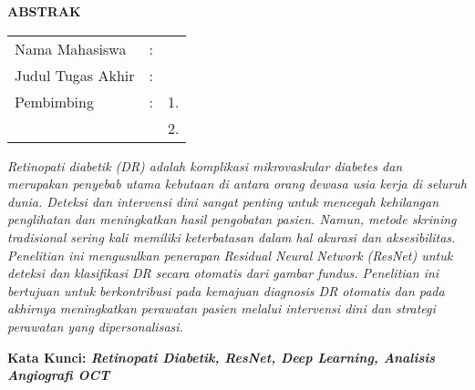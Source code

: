 \begin{center}
  \large\textbf{ABSTRAK}
\end{center}


\vspace{2ex}

\begingroup
\setlength{\tabcolsep}{0pt}

\noindent
\begin{tabularx}{\textwidth}{l >{\centering}m{2em} X}
  Nama Mahasiswa    & : & \name{}         \\

  Judul Tugas Akhir & : & \tatitle{}      \\

  Pembimbing        & : & 1. \advisor{}   \\
                    &   & 2. \coadvisor{} \\
\end{tabularx}
\endgroup

\emph{Retinopati diabetik (DR) adalah komplikasi mikrovaskular diabetes dan merupakan penyebab utama kebutaan di antara orang dewasa usia kerja di seluruh dunia. Deteksi dan intervensi dini sangat penting untuk mencegah kehilangan penglihatan dan meningkatkan hasil pengobatan pasien. Namun, metode skrining tradisional sering kali memiliki keterbatasan dalam hal akurasi dan aksesibilitas. Penelitian ini mengusulkan penerapan Residual Neural Network (ResNet) untuk deteksi dan klasifikasi DR secara otomatis dari gambar fundus. Penelitian ini bertujuan untuk berkontribusi pada kemajuan diagnosis DR otomatis dan pada akhirnya meningkatkan perawatan pasien melalui intervensi dini dan strategi perawatan yang dipersonalisasi.}

\textbf{Kata Kunci: \emph{Retinopati Diabetik, ResNet, Deep Learning, Analisis Angiografi OCT}}
